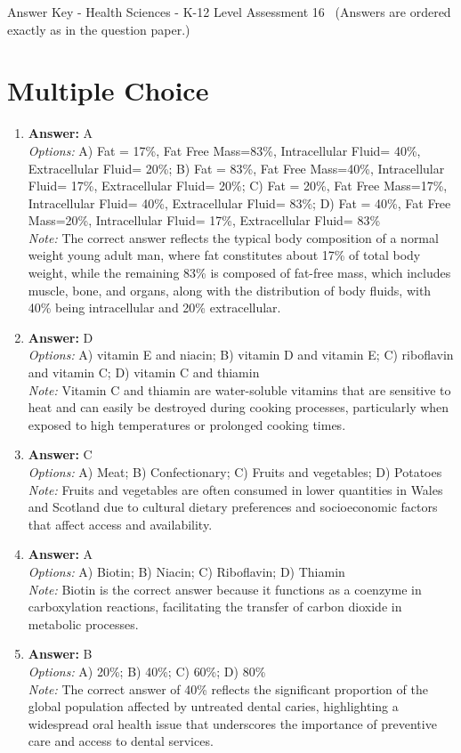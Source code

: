 \documentclass[12pt]{article}
\begin{document}
\begin{center}
Answer Key - Health Sciences - K-12 Level Assessment 16 \
\small (Answers are ordered exactly as in the question paper.)
\end{center}

\section*{Multiple Choice}
\begin{enumerate}[label=\arabic*.]
\item \textbf{Answer:} A
\\ \textit{Options:} A) Fat = 17\%, Fat Free Mass=83\%, Intracellular Fluid= 40\%, Extracellular Fluid= 20\%; B) Fat = 83\%, Fat Free Mass=40\%, Intracellular Fluid= 17\%, Extracellular Fluid= 20\%; C) Fat = 20\%, Fat Free Mass=17\%, Intracellular Fluid= 40\%, Extracellular Fluid= 83\%; D) Fat = 40\%, Fat Free Mass=20\%, Intracellular Fluid= 17\%, Extracellular Fluid= 83\%
\\ \textit{Note:} The correct answer reflects the typical body composition of a normal weight young adult man, where fat constitutes about 17\% of total body weight, while the remaining 83\% is composed of fat-free mass, which includes muscle, bone, and organs, along with the distribution of body fluids, with 40\% being intracellular and 20\% extracellular.
\item \textbf{Answer:} D
\\ \textit{Options:} A) vitamin E and niacin; B) vitamin D and vitamin E; C) riboflavin and vitamin C; D) vitamin C and thiamin
\\ \textit{Note:} Vitamin C and thiamin are water-soluble vitamins that are sensitive to heat and can easily be destroyed during cooking processes, particularly when exposed to high temperatures or prolonged cooking times.
\item \textbf{Answer:} C
\\ \textit{Options:} A) Meat; B) Confectionary; C) Fruits and vegetables; D) Potatoes
\\ \textit{Note:} Fruits and vegetables are often consumed in lower quantities in Wales and Scotland due to cultural dietary preferences and socioeconomic factors that affect access and availability.
\item \textbf{Answer:} A
\\ \textit{Options:} A) Biotin; B) Niacin; C) Riboflavin; D) Thiamin
\\ \textit{Note:} Biotin is the correct answer because it functions as a coenzyme in carboxylation reactions, facilitating the transfer of carbon dioxide in metabolic processes.
\item \textbf{Answer:} B
\\ \textit{Options:} A) 20\%; B) 40\%; C) 60\%; D) 80\%
\\ \textit{Note:} The correct answer of 40\% reflects the significant proportion of the global population affected by untreated dental caries, highlighting a widespread oral health issue that underscores the importance of preventive care and access to dental services.
\end{enumerate}
\end{document}
